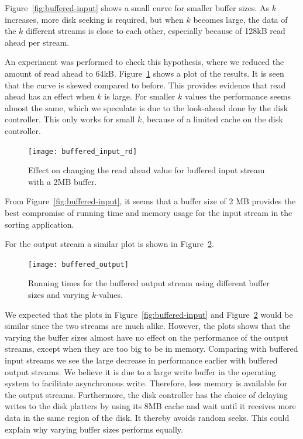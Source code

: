 \documentclass[a4paper,12pt]{article}
\begin{document}
Figure~\ref{fig:buffered-input} shows a small curve for smaller buffer
sizes. As $k$ increases, more disk seeking is required, but when $k$
becomes large, the data of the $k$ different streams is close to each other,
especially because of 128kB read ahead per stream.

An experiment was performed to check this hypothesis, where we reduced the amount of read ahead to 64kB. Figure~\ref{fig:buffered-readahead} shows a plot of the
results. It is seen that the curve is skewed compared to before. This
provides evidence that read ahead has an effect when $k$ is large. For
smaller $k$ values the performance seems almost the same, which we
speculate is due to the look-ahead done by the disk controller. This
only works for small $k$, because of a limited cache on the disk
controller.

\begin{figure}
  \centering
  \texttt{[image: buffered\_input\_rd]}
  \caption{Effect on changing the read ahead value for buffered input
    stream with a 2MB buffer.}
  \label{fig:buffered-readahead}
\end{figure}

From Figure~\ref{fig:buffered-input}, it seems that a buffer size of 2
MB provides the best compromise of running time and memory usage for
the input stream in the sorting application.

For the output stream a similar plot is shown in
Figure~\ref{fig:buffered-output}.

\begin{figure}[h!]
  \centering
  \texttt{[image: buffered\_output]}
  \caption{Running times for the buffered output stream using different
    buffer sizes and varying $k$-values.}
  \label{fig:buffered-output}
\end{figure}

We expected that the plots in Figure~\ref{fig:buffered-input} and
Figure~\ref{fig:buffered-output} would be similar since the two streams
are much alike. However, the plots shows that the varying the buffer sizes
almost have no effect on the performance of the output streams, except
when they are too big to be in memory. Comparing with buffered input streams we see the large decrease in performance earlier with buffered output streams. We believe it is due to a large write buffer in the operating system to facilitate asynchronous write. Therefore, less memory is available for the output streams.
Furthermore, the disk controller has the choice of delaying writes to the disk platters by using its 8MB cache and wait until it receives more data in the same region of the disk. It thereby avoids random seeks. This could explain why varying buffer sizes performs equally.
\end{document}
